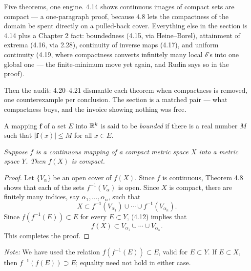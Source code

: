 
\begin{signpost}
Five theorems, one engine. 4.14 shows continuous images of compact sets are
compact --- a one-paragraph proof, because 4.8 lets the compactness of the
domain be spent directly on a pulled-back cover. Everything else in the
section is 4.14 plus a Chapter 2 fact: boundedness (4.15, via Heine--Borel),
attainment of extrema (4.16, via 2.28), continuity of inverse maps (4.17),
and uniform continuity (4.19, where compactness converts infinitely many
local $\delta$'s into one global one --- the finite-minimum move yet again,
and Rudin says so in the proof).

\smallskip
Then the audit: 4.20--4.21 dismantle each theorem when compactness is
removed, one counterexample per conclusion. The section is a matched pair ---
what compactness buys, and the invoice showing nothing was free.
\end{signpost}

A mapping $\mathbf{f}$ of a set $E$ into $\mathbb{R}^k$ is said to be \emph{bounded}
if there is a real number $M$ such that $|\mathbf{f}(x)| \le M$ for all
$x \in E$.

\emph{Suppose $f$ is a continuous mapping of a compact metric space $X$ into
a metric space $Y$. Then $f(X)$ is compact.}

\begin{proof}
Let $\{V_\alpha\}$ be an open cover of $f(X)$. Since $f$ is continuous,
Theorem 4.8 shows that each of the sets $f^{-1}(V_\alpha)$ is open. Since $X$
is compact, there are finitely many indices, say $\alpha_1,\dots,\alpha_n$,
such that
\begin{equation}
  X \subset f^{-1}(V_{\alpha_1}) \cup \cdots \cup f^{-1}(V_{\alpha_n}).
  \tag{4.12}
\end{equation}
Since $f(f^{-1}(E)) \subset E$ for every $E \subset Y$, (4.12) implies that
\begin{equation}
  f(X) \subset V_{\alpha_1} \cup \cdots \cup V_{\alpha_n}. \tag{4.13}
\end{equation}
This completes the proof.
\end{proof}

\emph{Note:} We have used the relation $f(f^{-1}(E)) \subset E$, valid for
$E \subset Y$. If $E \subset X$, then $f^{-1}(f(E)) \supset E$; equality need
not hold in either case.

